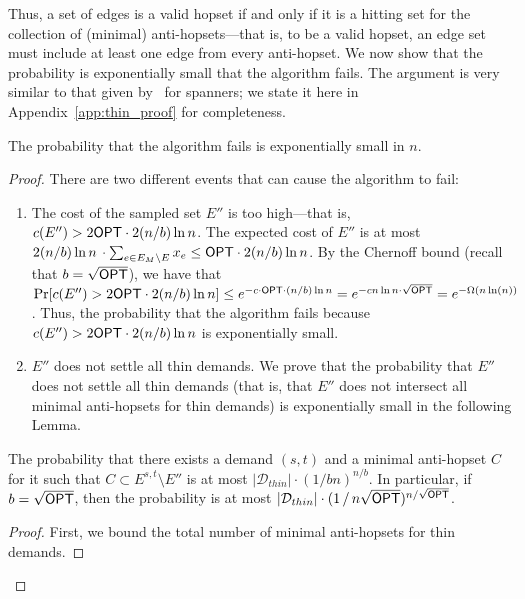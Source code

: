 Thus, a set of edges is a valid hopset if and only if it is a hitting set for the collection of (minimal) anti-hopsets---that is, to be a valid hopset, an edge set must include at least one edge from every anti-hopset.
We now show that the probability is exponentially small that the algorithm fails. The argument is very similar to that given by~\cite{BBMRY11} for spanners; we state it \iflong here \else in Appendix~\ref{app:thin_proof} \fi for completeness.

\begin{lemma} \label{lem:thin_fail}
    The probability that the algorithm fails is exponentially small in $n$.
\end{lemma}
\iflong
\begin{proof}
    There are two different events that can cause the algorithm to fail:   
    \begin{enumerate}
        \item The cost of the sampled set $E''$ is too high---that is, $c(E'') > 2{{\sf OPT}} \cdot 2(n/b)  \ln{n}$. The expected cost of $E''$ is at most $2(n/b) \ln{n} \, \cdot \sum_{e \in E_M \setminus E} x_e \leq {{\sf OPT}} \cdot 2(n/b)  \ln{n}$. By the Chernoff bound (recall that $b = \sqrt{{{\sf OPT}}}$), we have that $\Pr[c(E'') > 2{{\sf OPT}} \cdot 2(n/b)  \ln{n} ] \leq e^{-c \cdot {{\sf OPT}} \cdot (n/b) \ln{n}} = e^{-c n\ln{n} \cdot \sqrt{{{\sf OPT}}}} = e^{-\Omega(n \ln(n))}$. Thus, the probability that the algorithm fails because $c(E'') > 2{{\sf OPT}} \cdot 2(n/b)  \ln{n}$ is exponentially small.
        \item $E''$ does not settle all thin demands. We prove that the probability that $E''$ does not settle all thin demands (that is, that $E''$ does not intersect all minimal anti-hopsets for thin demands) is exponentially small in the following Lemma.
    \end{enumerate}
    
    \begin{lemma} \label{lem:thin_not_settle}
        The probability that there exists a demand $(s,t)$ and a minimal anti-hopset $C$ for it such that $C \subset E^{s,t} \setminus E''$ is at most $|\mathcal{D}_{thin}| \cdot \left( 1 / b n \right)^{n/b}$. In particular, if $b = \sqrt{{{\sf OPT}}}$, then the probability is at most $|\mathcal{D}_{thin}| \cdot (1 \, / \, n\sqrt{{{\sf OPT}}})^{n/\sqrt{{\sf OPT}}}$.
    \end{lemma}
    \begin{proof}
        First, we bound the total number of minimal anti-hopsets for thin demands. 


\end{proof}
\end{proof}
